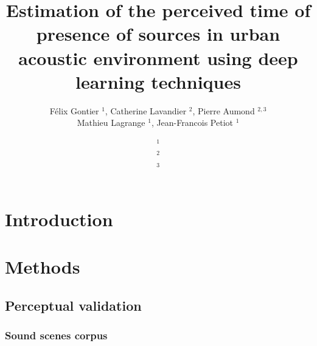 \documentclass[11pt,a4paper]{article}
\begin{document}
\author{F\'elix Gontier $^1$, Catherine Lavandier $^2$, Pierre Aumond $^{2, 3}$\\Mathieu Lagrange $^1$, Jean-Francois Petiot $^1$}
\date{
$^1$\\
$^2$\\
$^3$
}
\title{Estimation of the perceived time of presence of sources in urban acoustic environment using deep learning techniques}
\maketitle


\begin{abstract}

\end{abstract}

\section{Introduction}
\label{sec:intro}


\section{Methods}
\label{sec:methods}


\subsection{Perceptual validation}
\label{sec:pval}


\subsubsection{Sound scenes corpus}
\label{sec:pval_corp}
\end{document}

